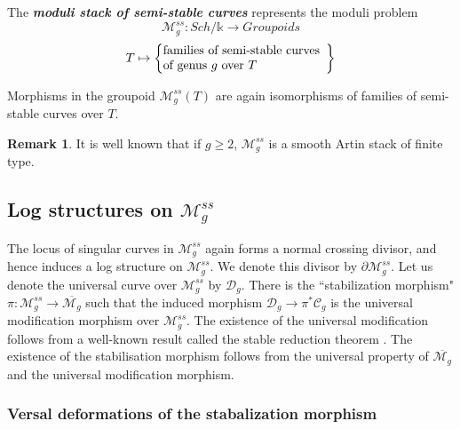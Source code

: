 \documentclass[11pt]{amsart}
\theoremstyle{plain}
\numberwithin{equation}{section}
\theoremstyle{definition}
\newtheorem{Rem}[Def]{Remark}
\theoremstyle{plain}
\begin{document}
\medskip

\noindent
The \emph{\bfseries moduli stack of semi-stable curves} represents the moduli problem
$$
{\mathcal M^{ss}_g}: Sch/\mathbb k\longrightarrow Groupoids $$ 
\begin{equation}
T
\mapsto \left\{
\begin{array}{@{}ll@{}}
\text{families of semi-stable curves}\\
\text{of genus} ~g~\text{over}~T
\end{array}\right\}
\end{equation}

\vspace{1em}

Morphisms in the groupoid ${\mathcal M^{ss}_g}(T)$ are again isomorphisms of families of semi-stable curves over $T$.

\medskip

\begin{Rem} It is well known that if $g\geq 2$,  ${\mathcal M^{ss}_g}$ is a smooth Artin stack \cite[0E72, Lemma 21.5]{34} of finite type.
\end{Rem}

\subsection{\textbf{Log structures on \texorpdfstring{${\mathcal M^{ss}_g}$}{Mssg}}} The locus of singular curves in ${\mathcal M^{ss}_g}$ again forms a normal crossing divisor, and hence induces a log structure on ${\mathcal M^{ss}_g}$. We denote this divisor by $\partial \mathcal M^{ss}_g$. Let us denote the universal curve over ${\mathcal M^{ss}_g}$ by $\mathcal D_g$. There is the ``stabilization morphism" $\pi: \mathcal M^{ss}_g\longrightarrow \overline{\mathcal M_g}$ such that the induced morphism $\mathcal D_g\longrightarrow \pi^*\mathcal C_g$ is the universal modification morphism over $\mathcal M^{ss}_g$. The existence of the universal modification follows from a well-known result called the stable reduction theorem \cite[Lemma 109.23.4.]{34}. The existence of the stabilisation morphism follows from the universal property of $\overline{\mathcal M_g}$ and the universal modification morphism. 

\subsubsection{\textbf{Versal deformations of the stabalization morphism}}\label{VerPic}
\end{document}
